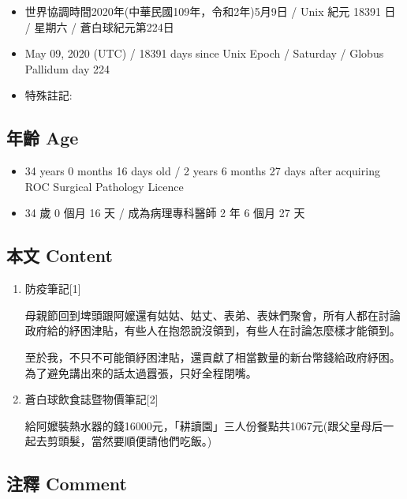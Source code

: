 \documentclass[a5paper, 12pt
]{book}
\providecommand{\tightlist}{%
  \setlength{\itemsep}{0pt}\setlength{\parskip}{0pt}}
\begin{document}
\begin{itemize}
\tightlist
\item
  世界協調時間2020年(中華民國109年，令和2年)5月9日 / Unix 紀元 18391 日
  / 星期六 / 蒼白球紀元第224日
\item
  May 09, 2020 (UTC) / 18391 days since Unix Epoch / Saturday / Globus
  Pallidum day 224
\item
  特殊註記:
\end{itemize}

\hypertarget{ux5e74ux9f61-age-69}{%
\subsection{年齡 Age}\label{ux5e74ux9f61-age-69}}

\begin{itemize}
\tightlist
\item
  34 years 0 months 16 days old / 2 years 6 months 27 days after
  acquiring ROC Surgical Pathology Licence
\item
  34 歲 0 個月 16 天 / 成為病理專科醫師 2 年 6 個月 27 天
\end{itemize}

\hypertarget{ux672cux6587-content-69}{%
\subsection{本文 Content}\label{ux672cux6587-content-69}}

\begin{enumerate}
\def\labelenumi{\arabic{enumi}.}
\item
  防疫筆記{[}1{]}

  母親節回到埤頭跟阿嬤還有姑姑、姑丈、表弟、表妹們聚會，所有人都在討論政府給的紓困津貼，有些人在抱怨說沒領到，有些人在討論怎麼樣才能領到。

  至於我，不只不可能領紓困津貼，還貢獻了相當數量的新台幣錢給政府紓困。為了避免講出來的話太過囂張，只好全程閉嘴。
\item
  蒼白球飲食誌暨物價筆記{[}2{]}

  給阿嬤裝熱水器的錢16000元，「耕讀園」三人份餐點共1067元(跟父皇母后一起去剪頭髮，當然要順便請他們吃飯。)
\end{enumerate}

\hypertarget{ux6ce8ux91cb-comment-69}{%
\subsection{注釋 Comment}\label{ux6ce8ux91cb-comment-69}}
\end{document}
